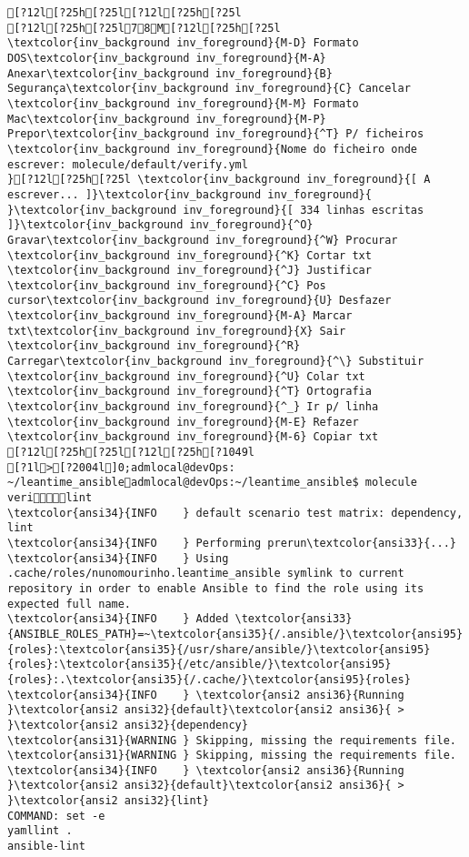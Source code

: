 \documentclass{scrartcl}
\begin{document}
\begin{Verbatim}
[?12l[?25h[?25l[?12l[?25h[?25l
[?12l[?25h[?25l78M[?12l[?25h[?25l         \textcolor{inv_background inv_foreground}{M-D} Formato DOS\textcolor{inv_background inv_foreground}{M-A} Anexar\textcolor{inv_background inv_foreground}{B} Segurança\textcolor{inv_background inv_foreground}{C} Cancelar           \textcolor{inv_background inv_foreground}{M-M} Formato Mac\textcolor{inv_background inv_foreground}{M-P} Prepor\textcolor{inv_background inv_foreground}{^T} P/ ficheiros
\textcolor{inv_background inv_foreground}{Nome do ficheiro onde escrever: molecule/default/verify.yml                                                                               }[?12l[?25h[?25l \textcolor{inv_background inv_foreground}{[ A escrever... ]}\textcolor{inv_background inv_foreground}{          }\textcolor{inv_background inv_foreground}{[ 334 linhas escritas ]}\textcolor{inv_background inv_foreground}{^O} Gravar\textcolor{inv_background inv_foreground}{^W} Procurar      \textcolor{inv_background inv_foreground}{^K} Cortar txt    \textcolor{inv_background inv_foreground}{^J} Justificar    \textcolor{inv_background inv_foreground}{^C} Pos cursor\textcolor{inv_background inv_foreground}{U} Desfazer     \textcolor{inv_background inv_foreground}{M-A} Marcar txt\textcolor{inv_background inv_foreground}{X} Sair    \textcolor{inv_background inv_foreground}{^R} Carregar\textcolor{inv_background inv_foreground}{^\} Substituir    \textcolor{inv_background inv_foreground}{^U} Colar txt     \textcolor{inv_background inv_foreground}{^T} Ortografia    \textcolor{inv_background inv_foreground}{^_} Ir p/ linha   \textcolor{inv_background inv_foreground}{M-E} Refazer      \textcolor{inv_background inv_foreground}{M-6} Copiar txt
[?12l[?25h[?25l[?12l[?25h[?1049l
[?1l>[?2004l]0;admlocal@devOps: ~/leantime_ansibleadmlocal@devOps:~/leantime_ansible$ molecule verilint
\textcolor{ansi34}{INFO    } default scenario test matrix: dependency, lint
\textcolor{ansi34}{INFO    } Performing prerun\textcolor{ansi33}{...}
\textcolor{ansi34}{INFO    } Using .cache/roles/nunomourinho.leantime_ansible symlink to current repository in order to enable Ansible to find the role using its expected full name.
\textcolor{ansi34}{INFO    } Added \textcolor{ansi33}{ANSIBLE_ROLES_PATH}=~\textcolor{ansi35}{/.ansible/}\textcolor{ansi95}{roles}:\textcolor{ansi35}{/usr/share/ansible/}\textcolor{ansi95}{roles}:\textcolor{ansi35}{/etc/ansible/}\textcolor{ansi95}{roles}:.\textcolor{ansi35}{/.cache/}\textcolor{ansi95}{roles}
\textcolor{ansi34}{INFO    } \textcolor{ansi2 ansi36}{Running }\textcolor{ansi2 ansi32}{default}\textcolor{ansi2 ansi36}{ > }\textcolor{ansi2 ansi32}{dependency}
\textcolor{ansi31}{WARNING } Skipping, missing the requirements file.
\textcolor{ansi31}{WARNING } Skipping, missing the requirements file.
\textcolor{ansi34}{INFO    } \textcolor{ansi2 ansi36}{Running }\textcolor{ansi2 ansi32}{default}\textcolor{ansi2 ansi36}{ > }\textcolor{ansi2 ansi32}{lint}
COMMAND: set -e
yamllint .
ansible-lint


\end{Verbatim}
\end{document}
